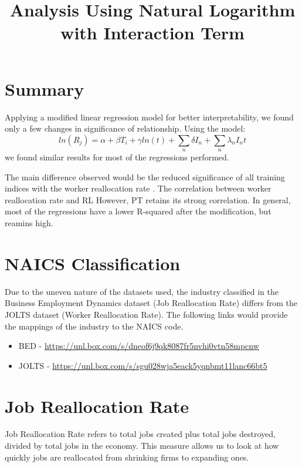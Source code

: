 \documentclass[
]{article}
\title{Analysis Using Natural Logarithm with Interaction Term}
\author{}
\date{\vspace{-2.5em}}
\providecommand{\tightlist}{%
  \setlength{\itemsep}{0pt}\setlength{\parskip}{0pt}}
\begin{document}
\maketitle

\hypertarget{summary}{%
\section{Summary}\label{summary}}

Applying a modified linear regression model for better interpretability,
we found only a few changes in significance of relationship. Using the
model:
\[ln(R_j) = \alpha + \beta T_i + \gamma ln(t) + \sum_n \delta I_n + \sum_n \lambda_n I_n t\]
we found similar results for most of the regressions performed.

The main difference observed would be the reduced significance of all
training indices with the worker reallocation rate . The correlation
between worker reallocation rate and RL However, PT retains its strong
correlation. In general, most of the regressions have a lower R-squared
after the modification, but reamins high.

\hypertarget{naics-classification}{%
\section{NAICS Classification}\label{naics-classification}}

Due to the uneven nature of the datasets used, the industry classified
in the Business Employment Dynamics dataset (Job Reallocation Rate)
differs from the JOLTS dataset (Worker Reallocation Rate). The following
links would provide the mappings of the industry to the NAICS code.

\begin{itemize}
\tightlist
\item
  BED - \url{https://unl.box.com/s/dneof6j9qk8087fr5nvhi0vtn58mpcnw}
\item
  JOLTS - \url{https://unl.box.com/s/sgu028wja5eack5yqnbmt11lanc66bt5}
\end{itemize}

\hypertarget{job-reallocation-rate}{%
\section{Job Reallocation Rate}\label{job-reallocation-rate}}

Job Reallocation Rate refers to total jobs created plus total jobs
destroyed, divided by total jobs in the economy. This measure allows us
to look at how quickly jobs are reallocated from shrinking firms to
expanding ones.
\end{document}
